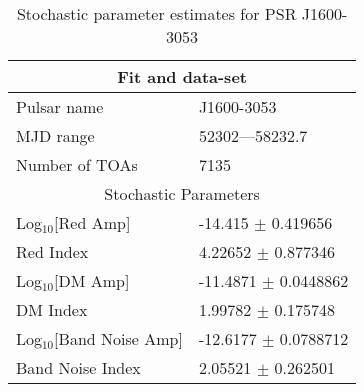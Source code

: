\documentclass{article}
\begin{document}
\begin{table*}
\caption{Stochastic parameter estimates for PSR J1600-3053}
\begin{tabular}{ll}
\hline\hline
\multicolumn{2}{c}{Fit and data-set} \\ 
\hline
Pulsar name\dotfill & J1600-3053 \\ 
MJD range\dotfill & 52302---58232.7 \\ 
Number of TOAs\dotfill & 7135 \\
\hline
\multicolumn{2}{c}{Stochastic Parameters} \\ 
\hline
Log$_{10}$[Red Amp] \dotfill & -14.415 $\pm$ 0.419656  \\ 
Red Index \dotfill & 4.22652 $\pm$ 0.877346  \\ 
Log$_{10}$[DM Amp] \dotfill & -11.4871 $\pm$ 0.0448862  \\ 
DM Index \dotfill & 1.99782 $\pm$ 0.175748  \\ 
Log$_{10}$[Band Noise Amp] \dotfill & -12.6177 $\pm$ 0.0788712  \\ 
Band Noise Index \dotfill & 2.05521 $\pm$ 0.262501  \\ 
\hline
\end{tabular}
\label{Table:J1600-3053}
\end{table*} 
\end{document}
